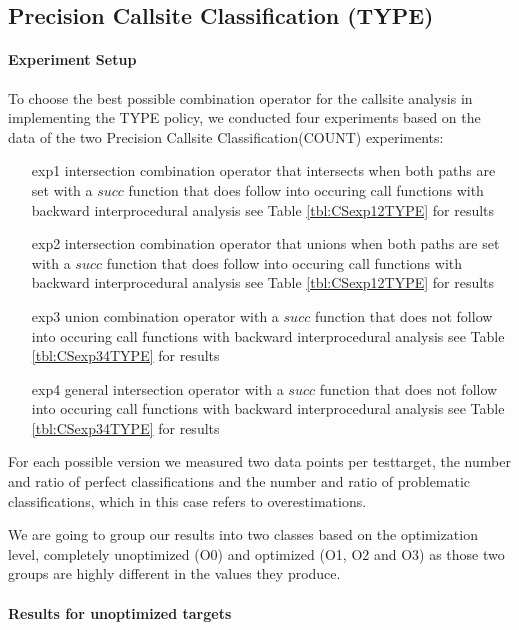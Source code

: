 \subsection{Precision Callsite Classification (TYPE)}
\label{subsection:typeshieldprecision}

\paragraph{Experiment Setup}
To choose the best possible combination operator for the callsite analysis in implementing the TYPE policy, we conducted four experiments based on the data of the two Precision Callsite Classification(COUNT) experiments:
\begin{enumerate}
\item[exp1] intersection combination operator that intersects when both paths are set with a $succ$ function that does follow into occuring call functions with backward interprocedural analysis see Table \ref{tbl:CSexp12TYPE} for results

\item[exp2] intersection combination operator that unions when both paths are set with a $succ$ function that does follow into occuring call functions  with backward interprocedural analysis  see Table \ref{tbl:CSexp12TYPE} for results

\item[exp3] union combination operator with a $succ$ function that does not follow into occuring call functions  with backward interprocedural analysis  see Table \ref{tbl:CSexp34TYPE} for results

\item[exp4] general intersection operator with a $succ$ function that does not follow into occuring call functions  with backward interprocedural analysis  see Table \ref{tbl:CSexp34TYPE} for results
\end{enumerate}
For each possible version we measured two data points per testtarget, the number and ratio of perfect classifications and the number and ratio of problematic classifications, which in this case refers to overestimations.

We are going to group our results into two classes based on the optimization level, completely unoptimized (O0) and optimized (O1, O2 and O3) as those two groups are highly different in the values they produce.

\paragraph{Results for unoptimized targets}

